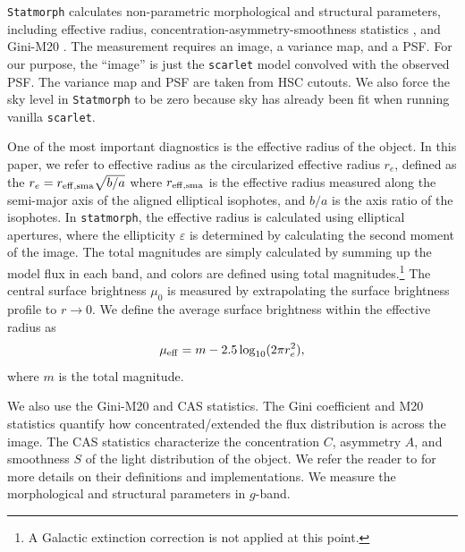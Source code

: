 \documentclass[twocolumn,astrosymb,twocolappendix]{aastex631}
\newcommand{\code}[1]{\texttt{#1}}
\begin{document}
\begin{CJK*}{UTF8}{gbsn}
\code{Statmorph} calculates non-parametric morphological and structural parameters, including effective radius, concentration-asymmetry-smoothness statistics \citep[CAS,][]{Conselice2003}, and Gini-M20 \citep{Abraham2003,Lotz2004}. The measurement requires an image, a variance map, and a PSF. For our purpose, the ``image'' is just the \code{scarlet} model convolved with the observed PSF. The variance map and PSF are taken from HSC cutouts. We also force the sky level in \code{Statmorph} to be zero because sky has already been fit when running vanilla \code{scarlet}. 

One of the most important diagnostics is the effective radius of the object. In this paper, we refer to effective radius as the circularized effective radius $r_{e}$, defined as the $r_{e} = r_{\rm eff, sma} \sqrt{b/a}$ where $r_{\rm eff, sma}$ is the effective radius measured along the semi-major axis of the aligned elliptical isophotes, and $b/a$ is the axis ratio of the isophotes. In \code{statmorph}, the effective radius is calculated using elliptical apertures, where the ellipticity $\varepsilon$ is determined by calculating the second moment of the image. The total magnitudes are simply calculated by summing up the model flux in each band, and colors are defined using total magnitudes.\footnote{A Galactic extinction correction is not applied at this point.} The central surface brightness $\mu_0$ is measured by extrapolating the surface brightness profile to $r\to 0$. We define the average surface brightness within the effective radius as 
\begin{equation}\label{eq:mu_eff}
    \mu_{\rm eff} = m - 2.5 \log_{10}(2 \pi r_e^2),
\end{equation}
where $m$ is the total magnitude. 

We also use the Gini-M20 and CAS statistics. The Gini coefficient and M20 statistics \citep{Abraham2003,Lotz2004} quantify how concentrated/extended the flux distribution is across the image. The CAS statistics characterize the concentration $C$, asymmetry $A$, and smoothness $S$ of the light distribution of the object. We refer the reader to \citet{statmorph} for more details on their definitions and implementations. We measure the morphological and structural parameters in $g$-band. %


\end{CJK*}
\end{document}
